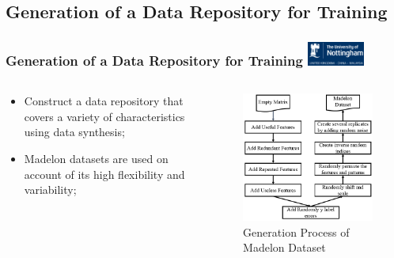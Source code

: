 \documentclass[aspectratio=1610]{beamer}
\newcommand{\UoN}
  {\hfill {\includegraphics[height=0.8cm]{nott_logo/nott_logo_white.png}}}
\begin{document}
\subsection{Generation of a Data Repository for Training}
\begin{frame}
\frametitle{Generation of a Data Repository for Training \UoN}

\begin{columns}
	\begin{column}{0.5\textwidth}
	\begin{itemize}
		\item Construct a data repository that covers a variety of characteristics using data synthesis;
		\item Madelon datasets are used on account of its high flexibility and variability;
	\end{itemize}	
	\end{column}
	
	\begin{column}{0.5\textwidth}
		\begin{figure}
			\includegraphics[scale=0.5]{Figures/Madelon.png}
		\caption{\scriptsize{Generation Process of Madelon Dataset}}
		\end{figure}
	\end{column}
\end{columns}
\end{frame}
\end{document}
